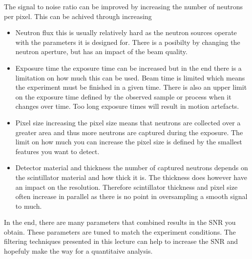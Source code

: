 \documentclass[letterpaper,10pt,english]{sphinxmanual}
\begin{document}
\sphinxAtStartPar
The signal to noise ratio can be improved by increasing the number of neutrons per pixel. This can be achived through increasing
\begin{itemize}
\item {} 
\sphinxAtStartPar
Neutron flux \sphinxhyphen{} this is usually relatively hard as the neutron sources operate with the parameters it is designed for. There is a posibilty by changing the neutron aperture, but has an impact of the beam quality.

\item {} 
\sphinxAtStartPar
Exposure time \sphinxhyphen{} the exposure time can be increased but in the end there is a limitation on how much this can be used. Beam time is limited which means the experiment must be finished in a given time. There is also an upper limit on the exposure time defined by the observed sample or process when it changes over time. Too long exposure times will result in motion artefacts.

\item {} 
\sphinxAtStartPar
Pixel size \sphinxhyphen{} increasing the pixel size means that neutrons are collected over a greater area and thus more neutrons are captured during the exposure. The limit on how much you can increase the pixel size is defined by the smallest features you want to detect.

\item {} 
\sphinxAtStartPar
Detector material and thickness \sphinxhyphen{} the number of captured neutrons depends on the scintillator material and how thick it is. The thickness does however have an impact on the resolution. Therefore scintillator thickness and pixel size often increase in parallel as there is no point in oversampling a smooth signal to much.

\end{itemize}

\sphinxAtStartPar
In the end, there are many parameters that combined results in the SNR you obtain. These parameters are tuned to match the experiment conditions. The filtering techniques presented in this lecture can help to increase the SNR and hopefuly make the way for a quantitaive analysis.
\end{document}
